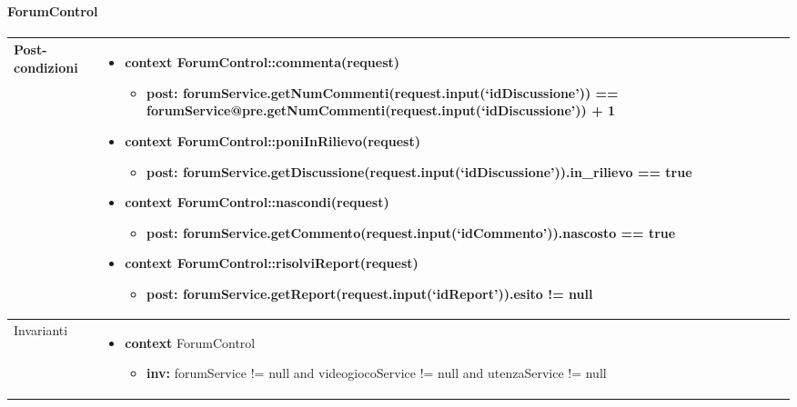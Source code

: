 \paragraph{ForumControl}
\small\begin{tabular}{|| l | p{28em} ||} 
\hline
Post-condizioni & \begin{itemize}[leftmargin=*]
	\item \textbf{context} ForumControl::commenta(request)
	\begin{itemize}
		\item[ ] \textbf{post:} forumService\newline .getNumCommenti(request.input(‘idDiscussione’)) == forumService\newline @pre.getNumCommenti(request.input(‘idDiscussione’)) + 1
	\end{itemize}

	\item \textbf{context} ForumControl::poniInRilievo(request)
	\begin{itemize}
		\item[ ] \textbf{post:} forumService\newline .getDiscussione(request.input(‘idDiscussione’)).in\_rilievo == true
	\end{itemize}

	\item \textbf{context} ForumControl::nascondi(request)
	\begin{itemize}
		\item[ ] \textbf{post:} forumService\newline .getCommento(request.input(‘idCommento’)).nascosto == true
	\end{itemize}

	\item \textbf{context} ForumControl::risolviReport(request)
	\begin{itemize}
		\item[ ] \textbf{post:} forumService\newline .getReport(request.input(‘idReport’)).esito != null
	\end{itemize}
\end{itemize}\\
\hline
Invarianti & \begin{itemize}
	\item \textbf{context} ForumControl
	\begin{itemize}
		\item[ ] \textbf{inv:} forumService != null and videogiocoService != null and utenzaService != null
	\end{itemize}
\end{itemize}\\
\hline
\end{tabular}

